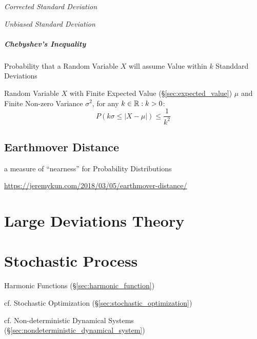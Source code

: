 \emph{Corrected Standard Deviation}

\emph{Unbiased Standard Deviation}



\subparagraph{Chebyshev's Inequality}\label{sec:chebyshevs_inequality}
\hfill

Probability that a Random Variable $X$ will assume Value within $k$
Standdard Deviations

Random Variable $X$ with Finite Expected Value
(\S\ref{sec:expected_value}) $\mu$ and Finite Non-zero Variance
$\sigma^2$, for any $k \in \mathbb{R} : k > 0$:
\[
  P(k\sigma \leq |X - \mu|) \leq \frac{1}{k^2}
\]



\subsection{Earthmover Distance}\label{sec:earthmover_distance}


a measure of ``nearness'' for Probability Distributions

\url{https://jeremykun.com/2018/03/05/earthmover-distance/}



\section{Large Deviations Theory}\label{sec:large_deviations_theory}

\section{Stochastic Process}\label{sec:stochastic_process}

Harmonic Functions (\S\ref{sec:harmonic_function})

\fist cf. Stochastic Optimization (\S\ref{sec:stochastic_optimization})

\fist cf. Non-deterministic Dynamical Systems
(\S\ref{sec:nondeterministic_dynamical_system})



